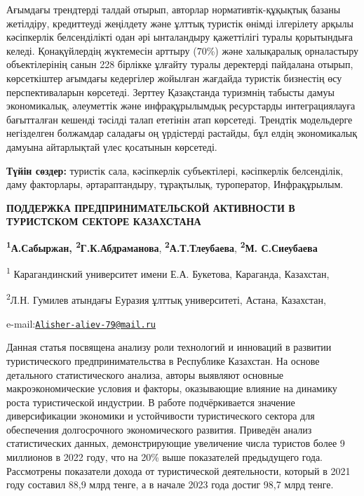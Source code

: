 Ағымдағы трендтерді талдай отырып, авторлар нормативтік-құқықтық базаны
жетілдіру, кредиттеуді жеңілдету және ұлттық туристік өнімді ілгерілету
арқылы кәсіпкерлік белсенділікті одан әрі ынталандыру қажеттілігі туралы
қорытындыға келеді. Қонақүйлердің жүктемесін арттыру (70\%) және
халықаралық орналастыру объектілерінің санын 228 бірлікке ұлғайту туралы
деректерді пайдалана отырып, көрсеткіштер ағымдағы кедергілер жойылған
жағдайда туристік бизнестің өсу перспективаларын көрсетеді. Зерттеу
Қазақстанда туризмнің табысты дамуы экономикалық, әлеуметтік және
инфрақұрылымдық ресурстарды интеграциялауға бағытталған кешенді тәсілді
талап ететінін атап көрсетеді. Трендтік модельдерге негізделген
болжамдар саладағы оң үрдістерді растайды, бұл елдің экономикалық
дамуына айтарлықтай үлес қосатынын көрсетеді.

{\bfseries Түйін сөздер:} туристік сала, кәсіпкерлік субъектілері,
кәсіпкерлік белсенділік, даму факторлары, әртараптандыру, тұрақтылық,
туроператор, Инфрақұрылым.

\begin{articleheader}

{\bfseries ПОДДЕРЖКА ПРЕДПРИНИМАТЕЛЬСКОЙ АКТИВНОСТИ В ТУРИСТСКОМ СЕКТОРЕ
КАЗАХСТАНА}

{\bfseries \textsuperscript{1}А.Сабыржан\textsuperscript{\envelope },
\textsuperscript{2}Г.К.Абдраманова},
{\bfseries \textsuperscript{2}А.Т.Тлеубаева}, {\bfseries \textsuperscript{2}М.
С.Сиеубаева}
\end{articleheader}
\begin{affiliation}

\textsuperscript{1} Карагандинский университет имени Е.А. Букетова,
Караганда, Казахстан,

\textsuperscript{2}Л.Н. Гумилев атындағы Еуразия ұлттық университеті,
Астана, Казахстан,

e-mail:\href{mailto:Alisher-aliev-79@mail.ru}{\nolinkurl{Alisher-aliev-79@mail.ru}}
\end{affiliation}

Данная статья посвящена анализу роли технологий и инноваций в развитии
туристического предпринимательства в Республике Казахстан. На основе
детального статистического анализа, авторы выявляют основные
макроэкономические условия и факторы, оказывающие влияние на динамику
роста туристической индустрии. В работе подчёркивается значение
диверсификации экономики и устойчивости туристического сектора для
обеспечения долгосрочного экономического развития. Приведён анализ
статистических данных, демонстрирующие увеличение числа туристов более 9
миллионов в 2022 году, что на 20\% выше показателей предыдущего года.
Рассмотрены показатели дохода от туристической деятельности, который в
2021 году составил 88,9 млрд тенге, а в начале 2023 года достиг 98,7
млрд тенге.

